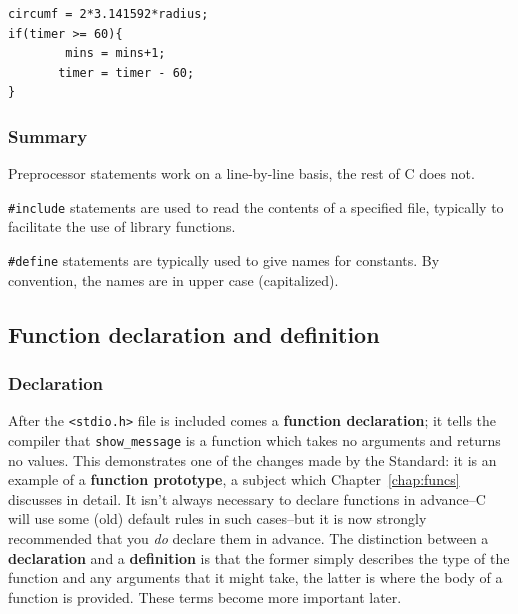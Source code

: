     \begin{Verbatim}
circumf = 2*3.141592*radius;
if(timer >= 60){
        mins = mins+1;
       timer = timer - 60;
}
\end{Verbatim}

   

   \subsubsection{Summary}
    Preprocessor statements work on a line-by-line basis, the rest of C does
     not.

    \texttt{\#include} statements are used to read the contents of a
     specified file, typically to facilitate the use of library functions.

    \texttt{\#define} statements are typically used to give names for
     constants. By convention, the names are in upper case (capitalized).

   
  

  \subsection{Function declaration and definition}
   

   \subsubsection{Declaration}
    

    After the \texttt{<stdio.h>} file is included comes a
     \textbf{function declaration}; it tells the compiler that
     \texttt{show\_message} is a function which takes no arguments and
     returns no values. This demonstrates one of the changes made by the
     Standard: it is an example of a \textbf{function prototype}, a subject
     which Chapter~\ref{chap:funcs} discusses in detail. It isn't always
     necessary to declare functions in advance--C will use some (old)
     default rules in such cases--but it is now strongly recommended that
     you \textit{do} declare them in advance. The distinction between a
     \textbf{declaration} and a \textbf{definition} is that the former
     simply describes the type of the function and any arguments that it might
     take, the latter is where the body of a function is provided. These terms
     become more important later.


